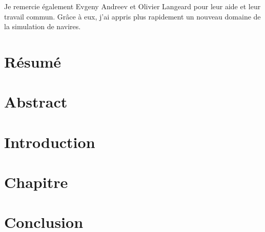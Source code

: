 \documentclass[12pt]{article}
\begin{document}
Je remercie également Evgeny Andreev et Olivier Langeard pour leur aide et leur travail commun. Grâce à eux, j'ai appris plus rapidement un nouveau domaine de la simulation de navires.

\newpage
\section*{\centering Résumé}

\newpage
\section*{\centering Abstract}

\renewcommand{\listtablename}{\centering Liste des tableaux}
\renewcommand{\contentsname}{\centering Table des matières}
\renewcommand{\listfigurename}{\centering Liste des figures}
\newpage
\tableofcontents
\newpage
\listoftables
\newpage
\listoffigures
\newpage

\section*{Introduction}

\newpage
\section{Chapitre}

\cite{freefem}

\newpage 
{}
\section*{Conclusion}

\renewcommand\refname{\centering Bibliographie}



\end{document}
